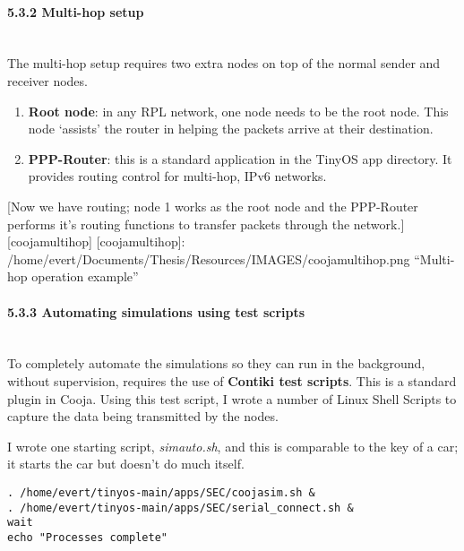 \paragraph{5.3.2 Multi-hop setup\\\\}\label{multi-hop-setup}

The multi-hop setup requires two extra nodes on top of the normal sender
and receiver nodes.

\begin{enumerate}
\def\labelenumi{\arabic{enumi}.}
\itemsep1pt\parskip0pt
\item
  \textbf{Root node}: in any RPL network, one node needs to be the root
  node. This node `assists' the router in helping the packets arrive at
  their destination.
\item
  \textbf{PPP-Router}: this is a standard application in the TinyOS app
  directory. It provides routing control for multi-hop, IPv6 networks.
\end{enumerate}

{[}Now we have routing; node 1 works as the root node and the PPP-Router
performs it's routing functions to transfer packets through the
network.{]}{[}coojamultihop{]} {[}coojamultihop{]}:
/home/evert/Documents/Thesis/Resources/IMAGES/coojamultihop.png
``Multi-hop operation example''

\paragraph{5.3.3 Automating simulations using test
scripts\\\\}\label{automating-simulations-using-test-scripts}

To completely automate the simulations so they can run in the
background, without supervision, requires the use of \textbf{Contiki
test scripts}. This is a standard plugin in Cooja. Using this test
script, I wrote a number of Linux Shell Scripts to capture the data
being transmitted by the nodes.

I wrote one starting script, \emph{simauto.sh}, and this is comparable
to the key of a car; it starts the car but doesn't do much itself.

\begin{verbatim}
. /home/evert/tinyos-main/apps/SEC/coojasim.sh &
. /home/evert/tinyos-main/apps/SEC/serial_connect.sh &
wait
echo "Processes complete"
\end{verbatim}

